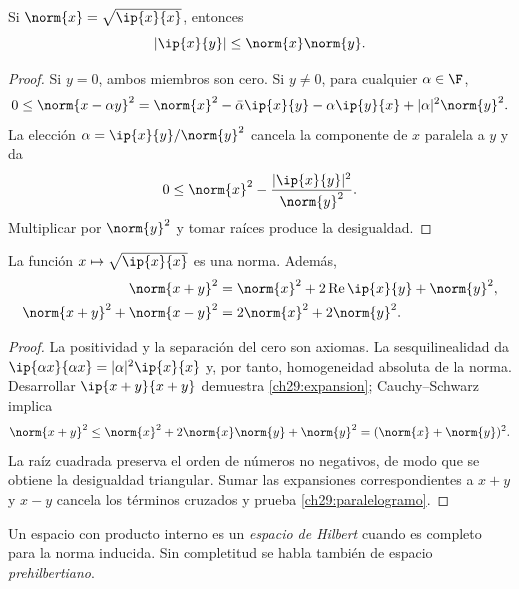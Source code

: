 \begin{teorema}\label{ch29:cs}
Si $\norm{x}=\sqrt{\ip{x}{x}}$, entonces
\[
 |\ip{x}{y}|\leq\norm{x}\norm{y}.
\]
\end{teorema}
\begin{proof}
Si $y=0$, ambos miembros son cero. Si $y\ne0$, para cualquier $\alpha\in\F$,
\[
0\leq\norm{x-\alpha y}^{2}
=\norm{x}^{2}-\bar\alpha\ip{x}{y}-\alpha\ip{y}{x}
 +|\alpha|^{2}\norm{y}^{2}.
\]
La elección $\alpha=\ip{x}{y}/\norm{y}^{2}$ cancela la componente de $x$ paralela a $y$ y da
\[
0\leq\norm{x}^{2}-\frac{|\ip{x}{y}|^{2}}{\norm{y}^{2}}.
\]
Multiplicar por $\norm{y}^{2}$ y tomar raíces produce la desigualdad.
\end{proof}

\begin{proposicion}\label{ch29:norma}
La función $x\mapsto\sqrt{\ip{x}{x}}$ es una norma. Además,
\begin{align}
 \norm{x+y}^{2}&=\norm{x}^{2}+2\operatorname{Re}\ip{x}{y}+\norm{y}^{2},\label{ch29:expansion}\\
 \norm{x+y}^{2}+\norm{x-y}^{2}&=2\norm{x}^{2}+2\norm{y}^{2}.\label{ch29:paralelogramo}
\end{align}
\end{proposicion}
\begin{proof}
La positividad y la separación del cero son axiomas. La sesquilinealidad da $\ip{\alpha x}{\alpha x}=|\alpha|^{2}\ip{x}{x}$ y, por tanto, homogeneidad absoluta de la norma. Desarrollar $\ip{x+y}{x+y}$ demuestra \eqref{ch29:expansion}; Cauchy--Schwarz implica
\[
 \norm{x+y}^{2}\leq \norm{x}^{2}+2\norm{x}\norm{y}+\norm{y}^{2}
 =(\norm{x}+\norm{y})^{2}.
\]
La raíz cuadrada preserva el orden de números no negativos, de modo que se obtiene la desigualdad triangular. Sumar las expansiones correspondientes a $x+y$ y $x-y$ cancela los términos cruzados y prueba \eqref{ch29:paralelogramo}.
\end{proof}

\begin{definicion}
Un espacio con producto interno es un \emph{espacio de Hilbert} cuando es completo para la norma inducida. Sin completitud se habla también de espacio \emph{prehilbertiano}.
\end{definicion}

